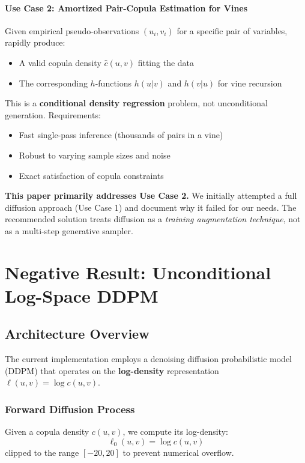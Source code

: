 \documentclass[11pt]{article}
\begin{document}
\paragraph{Use Case 2: Amortized Pair-Copula Estimation for Vines}
Given empirical pseudo-observations $(u_i, v_i)$ for a specific pair of variables, rapidly produce:
\begin{itemize}
    \item A valid copula density $\hat{c}(u,v)$ fitting the data
    \item The corresponding $h$-functions $h(u|v)$ and $h(v|u)$ for vine recursion
\end{itemize}
This is a \textbf{conditional density regression} problem, not unconditional generation. Requirements:
\begin{itemize}
    \item Fast single-pass inference (thousands of pairs in a vine)
    \item Robust to varying sample sizes and noise
    \item Exact satisfaction of copula constraints
\end{itemize}

\textbf{This paper primarily addresses Use Case 2.} We initially attempted a full diffusion approach (Use Case 1) and document why it failed for our needs. The recommended solution treats diffusion as a \emph{training augmentation technique}, not as a multi-step generative sampler.

\section{Negative Result: Unconditional Log-Space DDPM}

\subsection{Architecture Overview}

The current implementation employs a denoising diffusion probabilistic model (DDPM) \cite{ho2020denoising} that operates on the \textbf{log-density} representation $\ell(u,v) = \log c(u,v)$.

\subsubsection{Forward Diffusion Process}

Given a copula density $c(u,v)$, we compute its log-density:
\begin{equation}
\ell_0(u,v) = \log c(u,v)
\end{equation}
clipped to the range $[-20, 20]$ to prevent numerical overflow.
\end{document}
